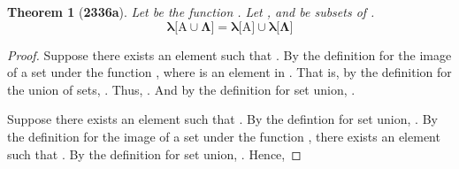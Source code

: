 \documentclass[preview]{standalone}
\newtheorem{theorem}{Theorem}
\begin{document}
\begin{theorem}[\textbf{2336a}]
    Let \bm{$\lambda$} be the function 
    \bm{$\lambda: \Gamma \to \Phi$}. 
    Let , and \bm{$\Lambda$} be subsets of \bm{$\Gamma$}. 
    \begin{equation*}
        \bm{
            \lambda \big[ \mathrm{A} \cup \Lambda \big] 
                = 
            \lambda \big[ \mathrm{A} \big] \cup \lambda \big[ \Lambda \big]
        }
    \end{equation*}
\end{theorem}

\begin{proof}
    Suppose there exists an element \bm{$\phi$} such that
    .
    By the definition for the image of a set under the function \bm{$\lambda$},
    \bm{$\phi = \lambda \big[ \iota \big]$} 
    where \bm{$\iota$} is an element in . 
    That is, by the definition for the union of sets,
    . 
    Thus, 
    .
    And by the definition for set union, 
    .
    
    Suppose there exists an element \bm{$\phi$} such that 
    .
    By the defintion for set union, 
    .
    By the definition for the image of a set under the function \bm{$\lambda$},
    there exists an element  such that 
    \bm{$\lambda \big[ \iota \big] = \phi$}.
    By the definition for set union, 
    .
    Hence,
\end{proof}
\end{document}
